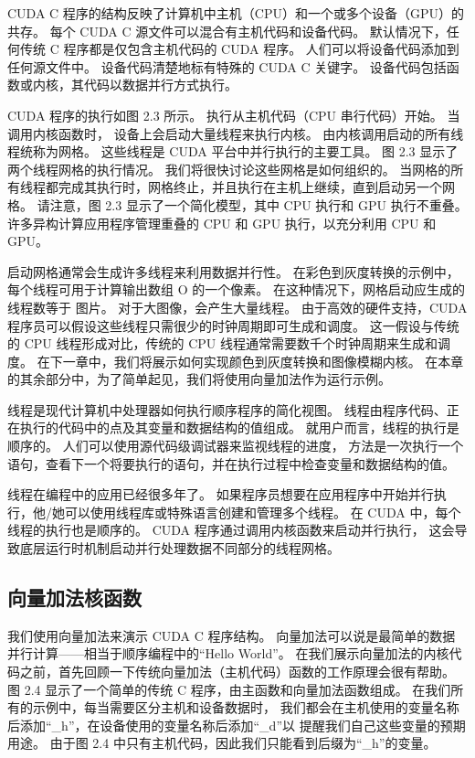 CUDA C 程序的结构反映了计算机中主机（CPU）和一个或多个设备（GPU）的共存。 
每个 CUDA C 源文件可以混合有主机代码和设备代码。 默认情况下，任何传统 C 程序都是仅包含主机代码的 CUDA 程序。 
人们可以将设备代码添加到任何源文件中。 设备代码清楚地标有特殊的 CUDA C 关键字。 
设备代码包括函数或内核，其代码以数据并行方式执行。

CUDA 程序的执行如图 2.3 所示。 执行从主机代码（CPU 串行代码）开始。 当调用内核函数时，
设备上会启动大量线程来执行内核。 由内核调用启动的所有线程统称为网格。 这些线程是 CUDA 平台中并行执行的主要工具。 
图 2.3 显示了两个线程网格的执行情况。 我们将很快讨论这些网格是如何组织的。 
当网格的所有线程都完成其执行时，网格终止，并且执行在主机上继续，直到启动另一个网格。 
请注意，图 2.3 显示了一个简化模型，其中 CPU 执行和 GPU 执行不重叠。 
许多异构计算应用程序管理重叠的 CPU 和 GPU 执行，以充分利用 CPU 和 GPU。

启动网格通常会生成许多线程来利用数据并行性。 在彩色到灰度转换的示例中，每个线程可用于计算输出数组 O 的一个像素。
在这种情况下，网格启动应生成的线程数等于 图片。 对于大图像，会产生大量线程。 
由于高效的硬件支持，CUDA 程序员可以假设这些线程只需很少的时钟周期即可生成和调度。 
这一假设与传统的 CPU 线程形成对比，传统的 CPU 线程通常需要数千个时钟周期来生成和调度。 
在下一章中，我们将展示如何实现颜色到灰度转换和图像模糊内核。 
在本章的其余部分中，为了简单起见，我们将使用向量加法作为运行示例。

\begin{remark}[线程]
线程是现代计算机中处理器如何执行顺序程序的简化视图。 线程由程序代码、正在执行的代码中的点及其变量和数据结构的值组成。 
就用户而言，线程的执行是顺序的。 人们可以使用源代码级调试器来监视线程的进度，
方法是一次执行一个语句，查看下一个将要执行的语句，并在执行过程中检查变量和数据结构的值。

线程在编程中的应用已经很多年了。 如果程序员想要在应用程序中开始并行执行，他/她可以使用线程库或特殊语言创建和管理多个线程。 
在 CUDA 中，每个线程的执行也是顺序的。 CUDA 程序通过调用内核函数来启动并行执行，
这会导致底层运行时机制启动并行处理数据不同部分的线程网格。
\end{remark}

\subsection{向量加法核函数}
我们使用向量加法来演示 CUDA C 程序结构。 向量加法可以说是最简单的数据并行计算——相当于顺序编程中的“Hello World”。 
在我们展示向量加法的内核代码之前，首先回顾一下传统向量加法（主机代码）函数的工作原理会很有帮助。 
图 2.4 显示了一个简单的传统 C 程序，由主函数和向量加法函数组成。 在我们所有的示例中，每当需要区分主机和设备数据时，
我们都会在主机使用的变量名称后添加“\_h”，在设备使用的变量名称后添加“\_d”以 提醒我们自己这些变量的预期用途。 
由于图 2.4 中只有主机代码，因此我们只能看到后缀为“\_h”的变量。


